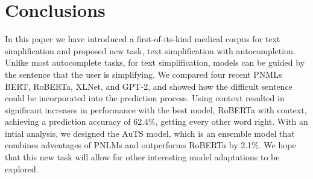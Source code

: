 \documentclass[11pt]{article}
\begin{document}
\begin{table}[t]
\centering
{}
\caption{\label{tab:ensembleResults} Accuracy of the majority vote, 4-class classification, combined class classification, AuTS, and the upperbound of ensemble models.}
\end{table}


\section{Conclusions}

In this paper we have introduced a first-of-its-kind medical corpus for text simplification and proposed new task, text simplification with autocompletion.  Unlike most autocomplete tasks, for text simplification, models can be guided by the sentence that the user is simplifying.  We compared four recent PNMLs BERT, RoBERTa, XLNet, and GPT-2, and showed how the difficult sentence could be incorporated into the prediction process. Using context resulted in significant increases in performance with the best model, RoBERTa with context, achieving a prediction accuracy of 62.4\%, getting every other word right. With an intial analysis, we designed the AuTS model, which is an ensemble model that combines adventages of PNLMs and outperforms RoBERTa by 2.1\%. We hope that this new task will allow for other interesting model adaptations to be explored.
\end{document}
